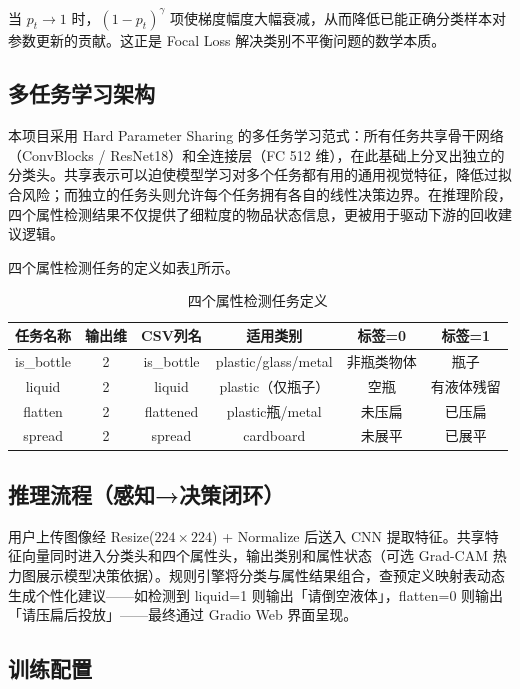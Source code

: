 \documentclass[11pt,a4paper]{ctexart}
\newcommand{\tabref}[1]{表\ref{#1}}
\begin{document}
当 $p_t \to 1$ 时，$(1-p_t)^\gamma$ 项使梯度幅度大幅衰减，从而降低已能正确分类样本对参数更新的贡献。这正是 Focal Loss 解决类别不平衡问题的数学本质。

\subsection{多任务学习架构}

本项目采用 Hard Parameter Sharing 的多任务学习范式：所有任务共享骨干网络（ConvBlocks / ResNet18）和全连接层（FC 512 维），在此基础上分叉出独立的分类头。共享表示可以迫使模型学习对多个任务都有用的通用视觉特征，降低过拟合风险；而独立的任务头则允许每个任务拥有各自的线性决策边界。在推理阶段，四个属性检测结果不仅提供了细粒度的物品状态信息，更被用于驱动下游的回收建议逻辑。

四个属性检测任务的定义如\tabref{tab:tasks}所示。

\begin{table}[H]
\centering
\caption{四个属性检测任务定义}
\label{tab:tasks}
\begin{tabular}{cccccc}
\toprule
\textbf{任务名称} & \textbf{输出维} & \textbf{CSV列名} & \textbf{适用类别} & \textbf{标签=0} & \textbf{标签=1} \\
\midrule
is\_bottle & 2 & is\_bottle & plastic/glass/metal & 非瓶类物体 & 瓶子 \\
liquid    & 2 & liquid    & plastic（仅瓶子） & 空瓶 & 有液体残留 \\
flatten   & 2 & flattened & plastic瓶/metal   & 未压扁 & 已压扁 \\
spread    & 2 & spread    & cardboard        & 未展平 & 已展平 \\
\bottomrule
\end{tabular}
\end{table}

\subsection{推理流程（感知→决策闭环）}

用户上传图像经 Resize($224\times224$) + Normalize 后送入 CNN 提取特征。共享特征向量同时进入分类头和四个属性头，输出类别和属性状态（可选 Grad-CAM 热力图展示模型决策依据）。规则引擎将分类与属性结果组合，查预定义映射表动态生成个性化建议——如检测到 liquid=1 则输出「请倒空液体」，flatten=0 则输出「请压扁后投放」——最终通过 Gradio Web 界面呈现。

\subsection{训练配置}
\end{document}
